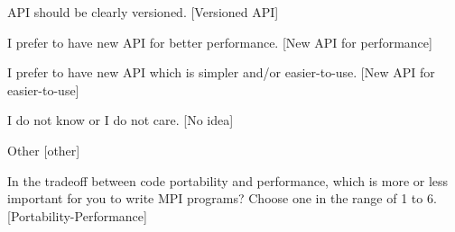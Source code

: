 \documentclass[preprint,5p,times]{elsarticle}
\begin{document}
{\begin{description}
\begin{inparaenum}[{\bf C}1)]
    \item API should be clearly versioned. [Versioned API]
    \item I prefer to have new API for better performance. [New API for performance]
    \item I prefer to have new API which is simpler and/or
      easier-to-use. [New API for easier-to-use]
    \item I do not know or I do not care. [No idea]
    \item Other [other]
    \end{inparaenum}
  \item[Q29:] In the tradeoff between code portability and performance,
    which is more or less important for you to write MPI programs?
    Choose one in the range of 1 to 6. [Portability-Performance]
  \end{description}
}
\end{document}
